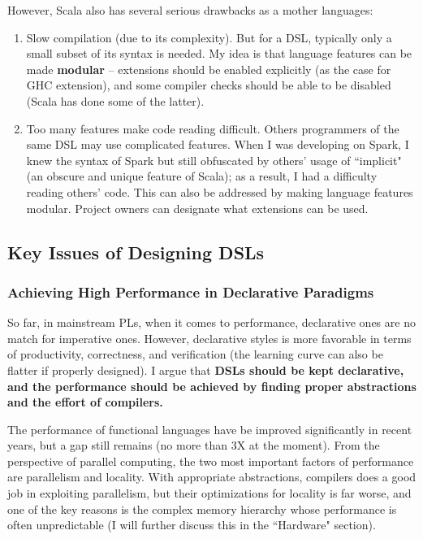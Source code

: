 \documentclass[11pt]{article}
\begin{document}
However, Scala also has several serious drawbacks as a mother languages:
\begin{enumerate}
    \item Slow compilation (due to its complexity).
    But for a DSL, typically only a small subset of its syntax is needed.
    My idea is that language features can be made \textbf{modular} -- extensions should be enabled explicitly (as the case for GHC extension), and some compiler checks should be able to be disabled (Scala has done some of the latter).
    \item Too many features make code reading difficult.
    Others programmers of the same DSL may use complicated features.
    When I was developing on Spark, I knew the syntax of Spark but still obfuscated by others' usage of ``implicit" (an obscure and unique feature of Scala); as a result, I had a difficulty reading others' code.
    This can also be addressed by making language features modular.
    Project owners can designate what extensions can be used.
\end{enumerate}
\subsection{Key Issues of Designing DSLs}
\subsubsection*{Achieving High Performance in Declarative Paradigms}
So far, in mainstream PLs, when it comes to performance, declarative ones are no match for imperative ones.
However, declarative styles is more favorable in terms of productivity, correctness, and verification (the learning curve can also be flatter if properly designed).
I argue that \textbf{DSLs should be kept declarative, and the performance should be achieved by finding proper abstractions and the effort of compilers.}

The performance of functional languages have be improved significantly in recent years, but a gap still remains (no more than 3X at the moment).
From the perspective of parallel computing, the two most important factors of performance are parallelism and locality.
With appropriate abstractions, compilers does a good job in exploiting parallelism, but their optimizations for locality is far worse, and one of the key reasons is the complex memory hierarchy whose performance is often unpredictable (I will further discuss this in the ``Hardware" section).
\end{document}
